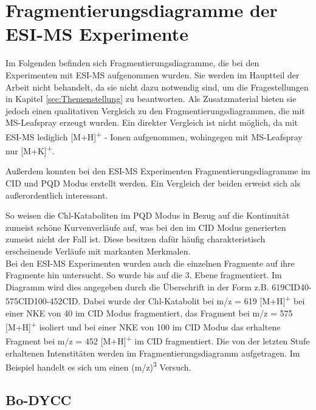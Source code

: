 \chapter{Fragmentierungsdiagramme der ESI-MS Experimente}

Im Folgenden befinden sich Fragmentierungsdiagramme, die bei den Experimenten mit ESI-MS aufgenommen wurden. Sie werden im Hauptteil der Arbeit nicht behandelt, da sie nicht dazu notwendig sind, um die Fragestellungen in Kapitel \ref{sec:Themenstellung} zu beantworten. Als Zusatzmaterial bieten sie jedoch einen qualitativen Vergleich zu den Fragmentierungsdiagrammen, die mit MS-Leafspray erzeugt wurden. Ein direkter Vergleich ist nicht möglich, da mit ESI-MS lediglich [M+H]\textsuperscript{+} - Ionen aufgenommen, wohingegen mit MS-Leafspray nur [M+K]\textsuperscript{+}.

Außerdem konnten bei den ESI-MS Experimenten Fragmentierungsdiagramme im CID und PQD Modus erstellt werden. Ein Vergleich der beiden erweist sich als außerordentlich interessant. 

So weisen die Chl-Kataboliten im PQD Modus in Bezug auf die Kontinuität zumeist schöne Kurvenverläufe auf, was bei den im CID Modus generierten zumeist nicht der Fall ist. Diese besitzen dafür häufig charakteristisch erscheinende Verläufe mit markanten Merkmalen. \\

Bei den ESI-MS Experimenten wurden auch die einzelnen Fragmente auf ihre Fragmente hin untersucht. So wurde bis auf die 3. Ebene fragmentiert. Im Diagramm wird dies angegeben durch die Überschrift in der Form z.B. 619CID40-575CID100-452CID. Dabei wurde der Chl-Katabolit bei m/z = 619 [M+H]\textsuperscript{+} bei einer NKE von 40 im CID Modus fragmentiert, das Fragment bei m/z = 575 [M+H]\textsuperscript{+} isoliert und bei einer NKE von 100 im CID Modus das erhaltene Fragment bei m/z = 452 [M+H]\textsuperscript{+} im CID fragmentiert. Die von der letzten Stufe erhaltenen Intenstitäten werden im Fragmentierungsdiagramm aufgetragen. Im Beispiel handelt es sich um einen (m/z)\textsuperscript{3} Versuch.

\pagebreak
\section{Bo-DYCC}

